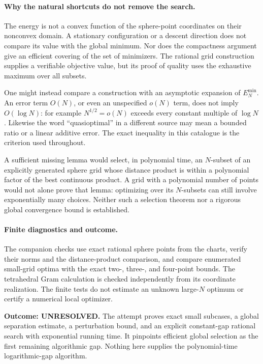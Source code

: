 \documentclass[11pt]{article}
\begin{document}
\paragraph{Why the natural shortcuts do not remove the search.}
The energy is not a convex function of the sphere-point coordinates on
their nonconvex domain. A stationary configuration or a descent direction
does not compare its value with the global minimum. Nor does the compactness
argument give an efficient covering of the set of minimizers. The rational
grid construction supplies a verifiable objective value, but its proof
of quality uses the exhaustive maximum over all subsets.

One might instead compare a construction with an asymptotic expansion of
$E_N^{\min}$. An error term $O(N)$, or even an unspecified $o(N)$ term,
does not imply $O(\log N)$: for example $N^{1/2}=o(N)$ exceeds every
constant multiple of $\log N$. Likewise the word ``quasioptimal'' in a
different source may mean a bounded ratio or a linear additive error.
The exact inequality in this catalogue is the criterion used throughout.

A sufficient missing lemma would select, in polynomial time, an $N$-subset
of an explicitly generated sphere grid whose distance product is within a
polynomial factor of the best continuous product. A grid with a polynomial
number of points would not alone prove that lemma: optimizing over its
$N$-subsets can still involve exponentially many choices. Neither such a
selection theorem nor a rigorous global convergence bound is established.

\paragraph{Finite diagnostics and outcome.}
The companion checks use exact rational sphere points from the charts,
verify their norms and the distance-product comparison, and compare
enumerated small-grid optima with the exact two-, three-, and four-point
bounds. The tetrahedral Gram calculation is checked independently from
its coordinate realization. The finite tests do not estimate an unknown
large-$N$ optimum or certify a numerical local optimizer.

\textbf{Outcome: UNRESOLVED.} The attempt proves exact small subcases,
a global separation estimate, a perturbation bound, and an explicit
constant-gap rational search with exponential running time. It pinpoints
efficient global selection as the first remaining algorithmic gap.
Nothing here supplies the polynomial-time logarithmic-gap algorithm.
\end{document}
